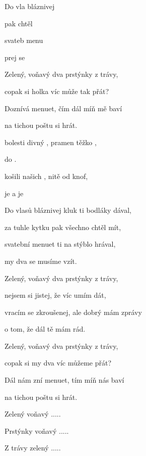 

\zs
Do vla bláznivej    

  pak  chtěl 

svateb menu   

 prej se   
\ks

\zs
Zelený, voňavý dva prstýnky z trávy,

copak si holka víc může tak přát?

Doznívá menuet, čím dál míň mě baví

na tichou poštu si hrát.
\ks

\zr
{} bolesti divný ,  pramen těžko ,

  do  .

 košili našich ,  nitě od 
knof,

 je  a  je   
\kr

\zs
Do vlasů bláznivej kluk ti bodláky dával,

za tuhle kytku pak všechno chtěl mít,

svatební menuet ti na stýblo hrával,

my dva se musíme vzít.
\ks

\zs
Zelený, voňavý dva prstýnky z trávy,

nejsem si jistej, že víc umím dát,

vracím se zkroušenej, ale dobrý mám zprávy

o tom, že dál tě mám rád.
\ks

\zs
Zelený, voňavý dva prstýnky z trávy,

copak si my dva víc můžeme přát?

Dál nám zní menuet, tím míň nás baví

na tichou poštu si hrát.



Zelený voňavý .....

Prstýnky voňavý .....

Z trávy zelený ..... 
\ks
\kp

